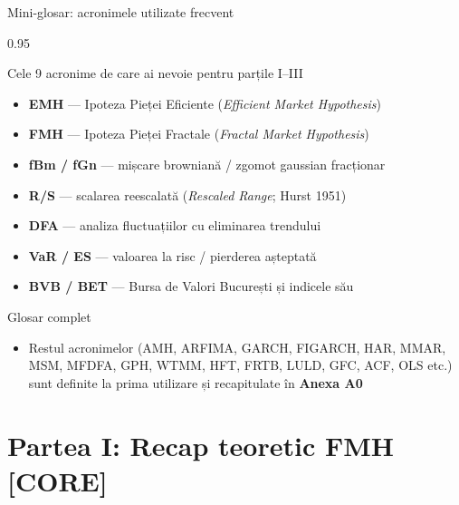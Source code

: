 \documentclass[9pt, aspectratio=169, t]{beamer}
\begin{document}
\begin{frame}[shrink=15]{Mini-glosar: acronimele utilizate frecvent}
\begin{cminipage}{0.95\textwidth}
\begin{block}{Cele 9 acronime de care ai nevoie pentru parțile I--III}
\begin{itemize}\setlength{\itemsep}{1pt}
    \item \textbf{EMH} --- Ipoteza Pieței Eficiente (\textit{Efficient Market Hypothesis})
    \item \textbf{FMH} --- Ipoteza Pieței Fractale (\textit{Fractal Market Hypothesis})
    \item \textbf{fBm / fGn} --- mișcare browniană / zgomot gaussian fracționar
    \item \textbf{R/S} --- scalarea reescalată (\textit{Rescaled Range}; Hurst 1951)
    \item \textbf{DFA} --- analiza fluctuațiilor cu eliminarea trendului
    \item \textbf{VaR / ES} --- valoarea la risc / pierderea așteptată
    \item \textbf{BVB / BET} --- Bursa de Valori București și indicele său
\end{itemize}
\end{block}
\begin{exampleblock}{Glosar complet}
\begin{itemize}\setlength{\itemsep}{0pt}
    \item Restul acronimelor (AMH, ARFIMA, GARCH, FIGARCH, HAR, MMAR, MSM, MFDFA, GPH, WTMM, HFT, FRTB, LULD, GFC, ACF, OLS etc.) sunt definite la prima utilizare și recapitulate în \textbf{Anexa A0}
\end{itemize}
\end{exampleblock}
\end{cminipage}
\end{frame}

\section{Partea I: Recap teoretic FMH [CORE]}
\end{document}
